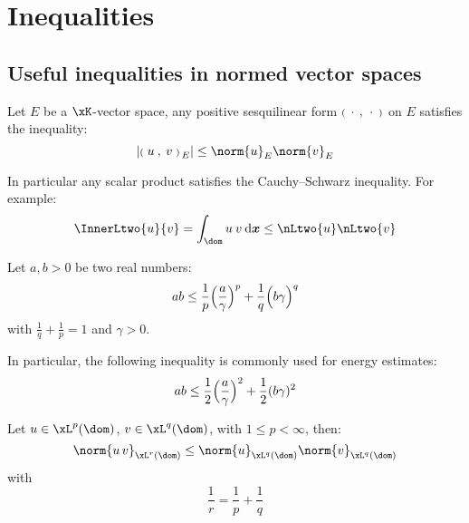 
\chapter{Inequalities}

\section{Useful inequalities in normed vector spaces}

\begin{lmm}\label{lm:cauchy_schwarz}
Let $E$ be a $\xK$-vector space, any positive sesquilinear form ${{\scriptstyle\mathbf{(}}\;\,{\mathbf\cdot}\,\:,\: \,{\mathbf\cdot}\, \;{\scriptstyle\mathbf{)}}}$ on $E$ satisfies the inequality:
\begin{equation*}
\lvert\InnerP{u}{v}{E}\rvert \leq \norm{u}_E \norm{v}_E
\end{equation*}
\end{lmm}

\begin{rmrk}
In particular any scalar product satisfies the Cauchy--Schwarz inequality.
For example:
\begin{equation*}
\InnerLtwo{u}{v} = \int_\dom u\: v\dx \leq \nLtwo{u} \nLtwo{v}
\end{equation*}
\end{rmrk}

\medskip
\begin{lmm}[Young]\label{lm:young}
Let $a,b > 0$ be two real numbers:
\begin{equation*}
   ab \leq \frac{1}{p} \Bigl(\frac{a}{\gamma}\Bigr)^p + \frac{1}{q} {\Bigl({b\gamma}\Bigr)}^q
\end{equation*}
with $\displaystyle \frac 1 q + \frac 1 p = 1$ and $\gamma > 0$.
\end{lmm}

\begin{rmrk}
In particular, the following inequality is commonly used for energy estimates:
\begin{equation*}
a b \leq \frac{1}{2}\Bigl(\frac{a}{\gamma}\Bigr)^2 + \frac{1}{2}(b \gamma)^2
\end{equation*}
\end{rmrk}

\begin{lmm}\label{lm:hoelder}
 Let $u\in\xL^{p}(\dom)$, $v\in\xL^{q}(\dom)$, with $1 \leq p < \infty$, then:
\begin{equation*}
\norm{u\,v}_{\xL^{r}(\dom)} \leq \norm{u}_{\xL^{q}(\dom)} \norm{v}_{\xL^{q}(\dom)}
\end{equation*}
with
\begin{equation*}
\dfrac{1}{r} = \dfrac{1}{p} + \dfrac{1}{q}
\end{equation*}
\end{lmm}

